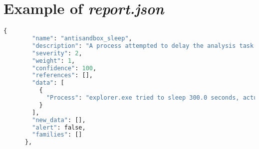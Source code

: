 \chapter{Example of \emph{report.json}} \label{app:report_example}

\begin{lstlisting}[language=Python]
    {
        "name": "antisandbox_sleep",
        "description": "A process attempted to delay the analysis task.",
        "severity": 2,
        "weight": 1,
        "confidence": 100,
        "references": [],
        "data": [
          {
            "Process": "explorer.exe tried to sleep 300.0 seconds, actually delayed analysis time by 0.0 seconds"
          }
        ],
        "new_data": [],
        "alert": false,
        "families": []
      },
    
\end{lstlisting}